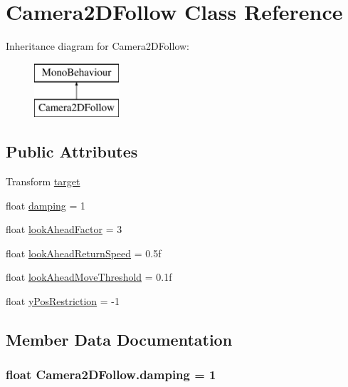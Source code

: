 \hypertarget{class_camera2_d_follow}{}\section{Camera2\+D\+Follow Class Reference}
\label{class_camera2_d_follow}
Inheritance diagram for Camera2\+D\+Follow\+:\begin{figure}[H]
\begin{center}
\leavevmode
\includegraphics[height=2.000000cm]{class_camera2_d_follow}
\end{center}
\end{figure}
\subsection*{Public Attributes}
\begin{DoxyCompactItemize}
\item 
Transform \hyperlink{class_camera2_d_follow_a089f2d40d10a271bc723e0f73fcc183a}{target}
\item 
float \hyperlink{class_camera2_d_follow_a2d7c118d0aa8d251d9dace48aae6c12b}{damping} = 1
\item 
float \hyperlink{class_camera2_d_follow_a86431f1e6fe757eba8a24e090af2c043}{look\+Ahead\+Factor} = 3
\item 
float \hyperlink{class_camera2_d_follow_a0144ad6ef4c5c33cc7b26484b92173ee}{look\+Ahead\+Return\+Speed} = 0.\+5f
\item 
float \hyperlink{class_camera2_d_follow_ac0fe0344d2e533a6d7d9cfb302edd441}{look\+Ahead\+Move\+Threshold} = 0.\+1f
\item 
float \hyperlink{class_camera2_d_follow_ab77b151514b4cc19eb5c424c60785bd1}{y\+Pos\+Restriction} = -\/1
\end{DoxyCompactItemize}


\subsection{Member Data Documentation}
\hypertarget{class_camera2_d_follow_a2d7c118d0aa8d251d9dace48aae6c12b}{}
\subsubsection[{damping}]{\setlength{\rightskip}{0pt plus 5cm}float Camera2\+D\+Follow.\+damping = 1}\label{class_camera2_d_follow_a2d7c118d0aa8d251d9dace48aae6c12b}
\hypertarget{class_camera2_d_follow_a86431f1e6fe757eba8a24e090af2c043}{}
